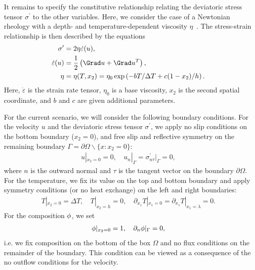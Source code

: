 It remains to specify the constitutive relationship relating the
deviatoric stress tensor $\sigma^{\prime}$ to the other
variables. Here, we consider the case of a Newtonian rheology with a
depth- and temperature-dependent viscosity
$\eta$~\citep{BlankenbachBusse1989}. The stress-strain relationship is
then described by the equations
\begin{align}
  \sigma^{\prime} &= 2 \eta \dot{\varepsilon} (u), \\
  \dot{\varepsilon}(u) &= \frac{1}{2} \left (\Grad u + \Grad u^T \right),  \\
  \eta &= \eta(T, x_2)
  = \eta_0 \exp \left( -b T/\Delta T + c (1 - x_2)/ h \right) .
\end{align}
Here, $\dot {\varepsilon}$ is the strain rate tensor, $\eta_0$ is a
base viscosity, $x_2$ is the second spatial coordinate, and $b$ and
$c$ are given additional parameters.

For the current scenario, we will consider the following boundary
conditions. For the velocity $u$ and the deviatoric stress tensor
$\sigma^{\prime}$, we apply no slip conditions on the bottom boundary
($x_2 = 0$), and free slip and reflective symmetry on the remaining
boundary $\Gamma = \partial \Omega \backslash \{x: x_2 = 0 \}$:
\begin{align}
  \label{vynnytska:eq:bcs}
  u |_{x_2 = 0} = 0, \quad
  u_n|_{\Gamma}  =  \sigma^{\prime}_{n \tau} |_{\Gamma} = 0,
\end{align}
where $n$ is the outward normal and $\tau$ is the tangent vector on
the boundary $\partial \Omega$. For the temperature, we fix its value
on the top and bottom boundary and apply symmetry conditions (or no
heat exchange) on the left and right boundaries:
\begin{align}
  T |_{x_2 = 0} = \Delta T, \quad T |_{x_2 = h}  = 0, \quad
  \partial_{x_1} T |_{x_1 = 0}  = \partial_{x_1} T |_{x_1 = \lambda} = 0.
\end{align}
For the composition $\phi$, we set
\begin{align}
  \phi |_{x_2 = 0} = 1, \quad \partial_{n} \phi|_{\Gamma} = 0,
\end{align}
i.e. we fix composition on the bottom of the box $\Omega$ and no flux
conditions on the remainder of the boundary. This condition can be
viewed as a consequence of the no outflow conditions for the velocity.

